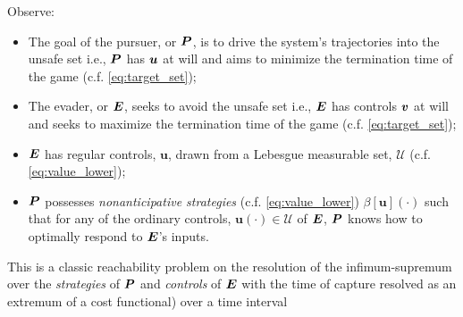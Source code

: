 %
Observe:
%
\begin{itemize}
	\item The goal of the pursuer, or $\bm{P}$, is to drive the system's trajectories into the unsafe set i.e., $\bm{P}$ has $\bm{u}$ at will and aims to minimize the termination time of the game  (c.f. \eqref{eq:target_set});
	\item The evader, or $\bm{E}$, seeks to avoid the unsafe  set i.e., $\bm{E}$ has controls $\bm{v}$ at will and seeks to maximize the termination time of the game (c.f.  \eqref{eq:target_set});
	\item $\bm{E}$ has regular controls, $\bm{u}$, drawn from a Lebesgue measurable set, $\mathcal{U}$ (c.f. \eqref{eq:value_lower});
	\item $\bm{P}$ possesses \textit{nonanticipative strategies} (c.f. \eqref{eq:value_lower}) \ie  $\beta[\bm{u}](\cdot)$ such that for any of the ordinary controls, $\bm{u}(\cdot) \in \mathcal{U}$ of $\bm{E}$, $\bm{P}$ knows how to optimally respond to $\bm{E}$'s inputs.
\end{itemize}
%
This is a classic reachability problem on the resolution of the infimum-supremum over the \textit{strategies} of $\bm{P}$ and \textit{controls} of $\bm{E}$ with the time of capture resolved as an extremum of a cost functional) over a time interval \ie %
%
%
